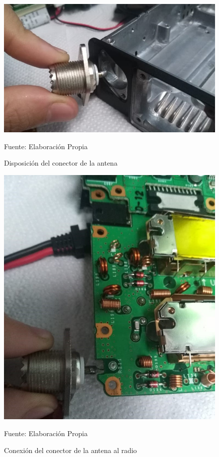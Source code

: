 \begin{figure}[H]
\centering
\includegraphics[scale=0.6]{Figuras/Radio_3.jpeg}
\caption{Disposición del conector de la antena }
Fuente: Elaboración Propia
\label{anexo18}
\end{figure}

\begin{figure}[H]
\centering
\includegraphics[scale=0.6]{Figuras/Radio_4.jpeg}
\caption{Conexión del conector de la antena al radio}
Fuente: Elaboración Propia
\label{anexo19}
\end{figure}